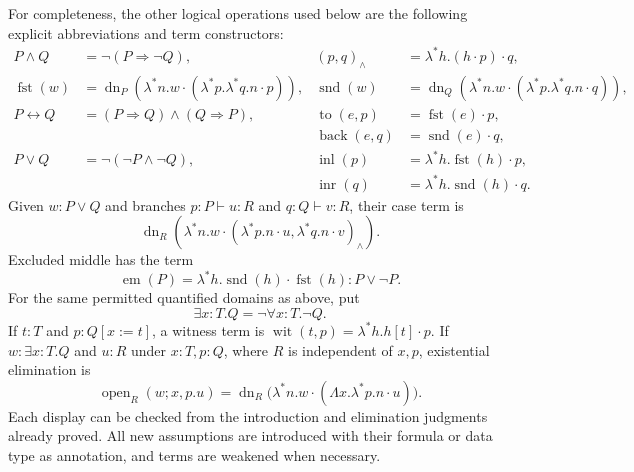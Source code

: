 For completeness, the other logical operations used below are the
following explicit abbreviations and term constructors:
\begin{align*}
 P\land Q&=\neg(P\Rightarrow\neg Q),&
 (p,q)_\land&=\lambda^*h.(h\cdot p)\cdot q,\\
 \operatorname{fst}(w)
   &=\operatorname{dn}_P
       (\lambda^*n.w\cdot(\lambda^*p.\lambda^*q.n\cdot p)),&
 \operatorname{snd}(w)
   &=\operatorname{dn}_Q
       (\lambda^*n.w\cdot(\lambda^*p.\lambda^*q.n\cdot q)),\\
 P\leftrightarrow Q&=(P\Rightarrow Q)\land(Q\Rightarrow P),&
 \operatorname{to}(e,p)&=\operatorname{fst}(e)\cdot p,\\
 &&\operatorname{back}(e,q)&=\operatorname{snd}(e)\cdot q,\\
 P\lor Q&=\neg(\neg P\land\neg Q),&
 \operatorname{inl}(p)&=\lambda^*h.\operatorname{fst}(h)\cdot p,\\
 &&\operatorname{inr}(q)&=\lambda^*h.\operatorname{snd}(h)\cdot q.
\end{align*}
Given $w:P\lor Q$ and branches $p:P\vdash u:R$ and
$q:Q\vdash v:R$, their case term is
\[
 \operatorname{dn}_R\left(
   \lambda^*n.w\cdot
       (\lambda^*p.n\cdot u,\lambda^*q.n\cdot v)_\land\right).
\]
Excluded middle has the term
\[
      \operatorname{em}(P)=
        \lambda^*h.\operatorname{snd}(h)\cdot\operatorname{fst}(h)
          :P\lor\neg P.
\]
For the same permitted quantified domains as above, put
\[
 \exists x:T.Q=\neg\forall x:T.\neg Q.
\]
If $t:T$ and $p:Q[x:=t]$, a witness term is
$\operatorname{wit}(t,p)=\lambda^*h.h[t]\cdot p$.
If $w:\exists x:T.Q$ and $u:R$ under $x:T,p:Q$, where $R$ is
independent of $x,p$, existential elimination is
\[
 \operatorname{open}_R(w;x,p.u)=
  \operatorname{dn}_R\bigl(
    \lambda^*n.w\cdot(\Lambda x.\lambda^*p.n\cdot u)\bigr).
\]
Each display can be checked from the introduction and elimination
judgments already proved.  All new assumptions are introduced with their
formula or data type as annotation, and terms are weakened when necessary.


